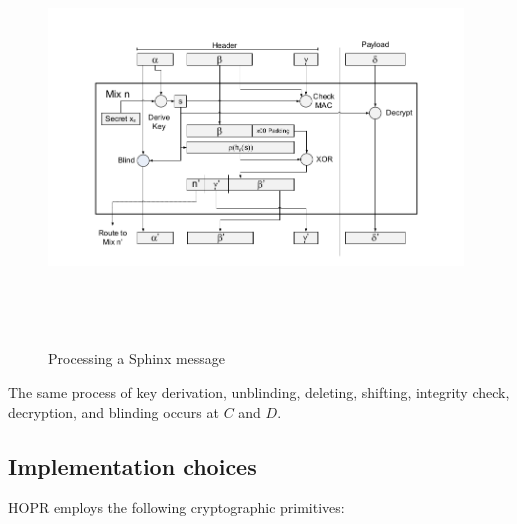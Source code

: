 \begin{figure}[H]
    \centering
    \includegraphics[width=11cm,height=11cm,keepaspectratio]{../yellowpaper/images/sphinx1.png}
    \caption{Processing a Sphinx message \cite{sphinxpaper}}
    \label{fig:The processing of a Sphinx message }
\end{figure}
The same process of key derivation, unblinding, deleting, shifting, integrity check, decryption, and blinding occurs at $C$ and $D$.

\subsection{Implementation choices}

HOPR employs the following cryptographic primitives:

